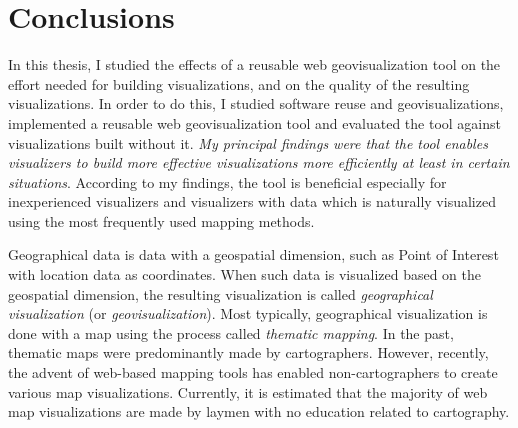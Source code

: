 
\chapter{Conclusions}
\label{chapter:conclusions}

In this thesis, I studied the effects of a reusable web geovisualization tool on the effort needed for building visualizations, and on the quality of the resulting visualizations. In order to do this, I studied software reuse and geovisualizations, implemented a reusable web geovisualization tool and evaluated the tool against visualizations built without it. \emph{My principal findings were that the tool enables visualizers to build more effective visualizations more efficiently at least in certain situations}. According to my findings, the tool is beneficial especially for inexperienced visualizers and visualizers with data which is naturally visualized using the most frequently used mapping methods.

Geographical data is data with a geospatial dimension, such as Point of Interest with location data as coordinates. When such data is visualized based on the geospatial dimension, the resulting visualization is called \emph{geographical visualization} (or \emph{geovisualization}). Most typically, geographical visualization is done with a map using the process called \emph{thematic mapping}. In the past, thematic maps were predominantly made by cartographers. However, recently, the advent of web-based mapping tools has enabled non-cartographers to create various map visualizations. Currently, it is estimated that the majority of web map visualizations are made by laymen with no education related to cartography.



